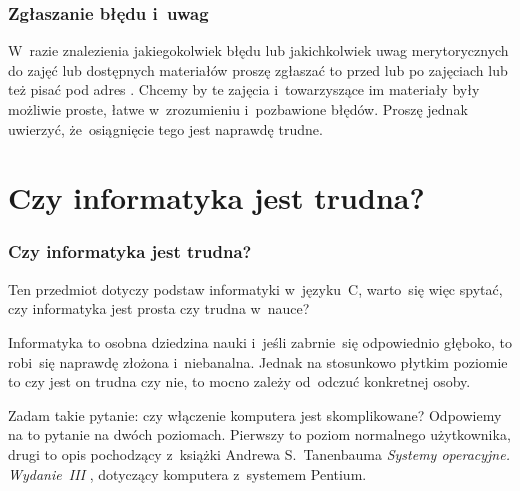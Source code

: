 \documentclass[10pt,t]{beamer}
\begin{document}
\begin{frame}
  \frametitle{Zgłaszanie błędu i~uwag}


  W~razie znalezienia jakiegokolwiek błędu lub jakichkolwiek uwag
  merytorycznych do zajęć lub dostępnych materiałów proszę zgłaszać to
  przed lub po zajęciach lub też pisać pod adres \email. Chcemy by te
  zajęcia i~towarzyszące im materiały były możliwie proste, łatwe
  w~zrozumieniu i~pozbawione błędów. Proszę jednak uwierzyć, że~osiągnięcie
  tego jest naprawdę trudne.

\end{frame}
























\section{Czy informatyka jest trudna?}



\begin{frame}
  \frametitle{Czy informatyka jest trudna?}


  Ten przedmiot dotyczy podstaw informatyki w~języku~C, warto~się
  więc spytać, czy informatyka jest prosta czy trudna w~nauce?

  Informatyka to osobna dziedzina nauki i~jeśli zabrnie~się odpowiednio
  głęboko, to robi~się naprawdę złożona i~niebanalna. Jednak na stosunkowo
  płytkim poziomie to czy jest on trudna czy nie, to mocno zależy od~odczuć
  konkretnej osoby.

  Zadam takie pytanie: czy włączenie komputera jest skomplikowane?
  Odpowiemy na to pytanie na dwóch poziomach. Pierwszy to poziom normalnego
  użytkownika, drugi to opis pochodzący z~książki Andrewa S.~Tanenbauma
  \textit{Systemy operacyjne. Wydanie~III}
  \parencite{Tannenbaum-Systemy-Operacyjne-Wydanie-III-Pub-2013}, dotyczący
  komputera z~systemem Pentium.

\end{frame}
\end{document}
